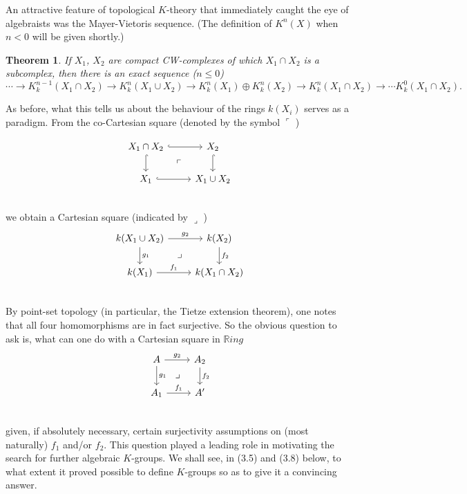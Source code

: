 \documentclass[openany,leqno]{book}  %
\newtheorem{theorem}{Theorem}[chapter]
\begin{document}
An attractive feature of topological $K$-theory that immediately caught the eye of algebraists was the Mayer-Vietoris sequence. (The definition of $K^n(X)$ when $n < 0$ will be given shortly.)

\begin{theorem}
If $X_1$, $X_2$ are compact CW-complexes of which $X_1 \cap X_2$ is a subcomplex, then there is an exact sequence ($n \leqslant 0$)
\[ \cdots \longrightarrow K_k^{n-1}(X_1\cap X_2)\longrightarrow  K^n_k(X_1\cup X_2) \longrightarrow K_k^n(X_1) \oplus K_k^n(X_2)\longrightarrow K_k^n(X_1\cap X_2) \longrightarrow \cdots K_k^0(X_1\cap X_2).\]
\end{theorem}

As before, what this tells us about the behaviour of the rings $k(X_i)$ serves as a paradigm. From the co-Cartesian square (denoted by the symbol $\ulcorner$ )

 \[
 \begin{tikzcd}
 X_1\cap X_2 \arrow[hook]{r} \arrow[hook]{d} \arrow[dr, phantom, "\ulcorner"] &
  X_2 \arrow[hook]{d}\\
 X_1 \arrow[hook]{r} & X_1\cup X_2\\
 \end{tikzcd}
 \]
we obtain a Cartesian square (indicated by $\lrcorner$ )
\[
\begin{tikzcd}
k(X_1\cup X_2) \arrow{r}{g_2} \arrow{d}{g_1} \arrow[dr, phantom, "\lrcorner"] & k(X_2) \arrow{d}{f_2}\\
k(X_1) \arrow{r}{f_1} & k(X_1\cap X_2) \\
\end{tikzcd}
\]
By point-set topology (in particular, the Tietze extension theorem), one notes that all four homomorphisms are in fact surjective. So the obvious question to ask is, what can one do with a Cartesian square in $\mathbb{R}ing$
\begin{equation}
  \begin{tikzcd}
A \arrow{r}{g_2} \arrow{d}{g_1} \arrow[dr, phantom, "\lrcorner"]& A_2 \arrow{d}{f_2}\\
A_1 \arrow{r}{f_1} & A' \\
\end{tikzcd}
\end{equation}
given, if absolutely necessary, certain surjectivity assumptions on (most naturally) $f_1$ and/or $f_2$. This question played a leading role in motivating the search for further algebraic $K$-groups. We shall see, in (3.5) and (3.8) below, to what extent it proved possible to define $K$-groups so as to give it a convincing answer.
\end{document}
